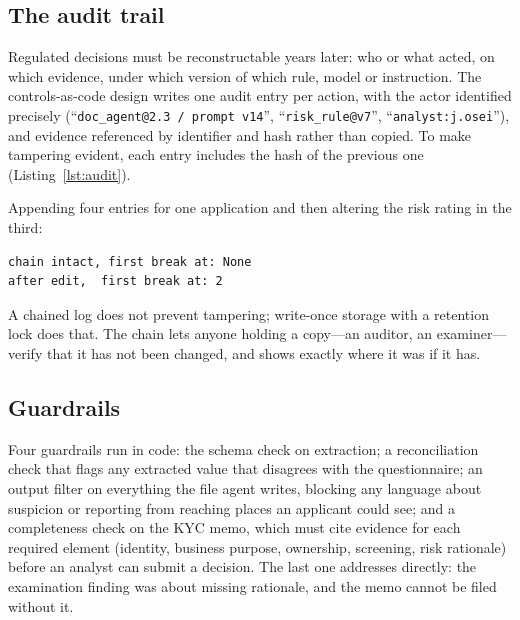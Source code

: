 \subsection{The audit trail}

Regulated decisions must be reconstructable years later: who or what acted, on which evidence, under which version of which rule, model or instruction. The controls-as-code design writes one audit entry per action, with the actor identified precisely (``\texttt{doc\_agent@2.3 / prompt v14}'', ``\texttt{risk\_rule@v7}'', ``\texttt{analyst:j.osei}''), and evidence referenced by identifier and hash rather than copied. To make tampering evident, each entry includes the hash of the previous one (Listing~\ref{lst:audit}).



Appending four entries for one application and then altering the risk rating in the third:
\begin{lstlisting}[language={}, numbers=none, frame=none, xleftmargin=1.5em]
chain intact, first break at: None
after edit,  first break at: 2
\end{lstlisting}

A chained log does not prevent tampering; write-once storage with a retention lock does that. The chain lets anyone holding a copy---an auditor, an examiner---verify that it has not been changed, and shows exactly where it was if it has.

\subsection{Guardrails}

Four guardrails run in code: the schema check on extraction; a reconciliation check that flags any extracted value that disagrees with the questionnaire; an output filter on everything the file agent writes, blocking any language about suspicion or reporting from reaching places an applicant could see; and a completeness check on the KYC memo, which must cite evidence for each required element (identity, business purpose, ownership, screening, risk rationale) before an analyst can submit a decision. The last one addresses  directly: the examination finding was about missing rationale, and the memo cannot be filed without it.

